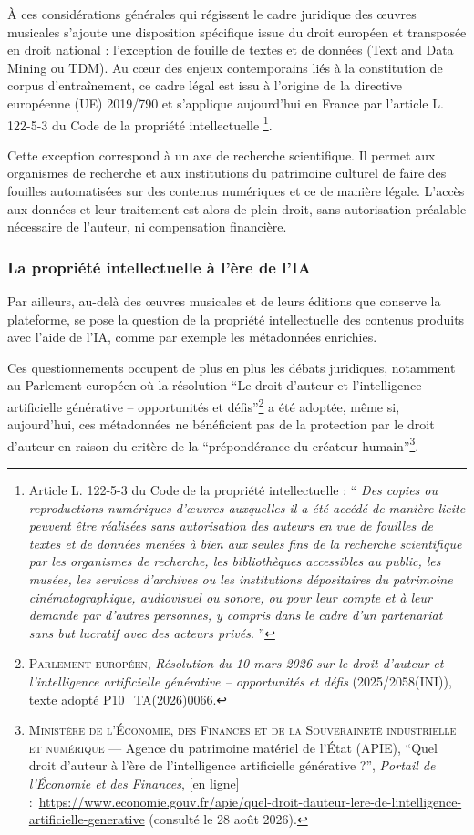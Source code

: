 À ces considérations générales qui régissent le cadre juridique des œuvres musicales s'ajoute une disposition spécifique issue du droit européen et transposée en droit national : l'exception de fouille de textes et de données (Text and Data Mining ou TDM). Au cœur des enjeux contemporains liés à la constitution de corpus d'entraînement, ce cadre légal est issu à l’origine de la directive européenne (UE) 2019/790 et s'applique aujourd'hui en France par l'article L. 122-5-3 du Code de la propriété intellectuelle
\footnote
{Article L. 122-5-3 du Code de la propriété intellectuelle :
	\enquote{
		\textit{Des copies ou reproductions numériques d'œuvres auxquelles il a été accédé de manière licite peuvent être réalisées sans autorisation des auteurs en vue de fouilles de textes et de données menées à bien aux seules fins de la recherche scientifique par les organismes de recherche, les bibliothèques accessibles au public, les musées, les services d'archives ou les institutions dépositaires du patrimoine cinématographique, audiovisuel ou sonore, ou pour leur compte et à leur demande par d'autres personnes, y compris dans le cadre d'un partenariat sans but lucratif avec des acteurs privés}.
	}
}.

Cette exception correspond à un axe de recherche scientifique. Il permet aux organismes de recherche et aux institutions du patrimoine culturel de faire des fouilles automatisées sur des contenus numériques et ce de manière légale. L'accès aux données et leur traitement est alors de plein-droit, sans autorisation préalable nécessaire de l'auteur, ni compensation financière.


\subsubsection*{La propriété intellectuelle à l'ère de l'IA}

Par ailleurs, au-delà des œuvres musicales et de leurs éditions que conserve la plateforme, se pose la question de la propriété intellectuelle des contenus produits avec l'aide de l'IA, comme par exemple les métadonnées enrichies.

Ces questionnements occupent de plus en plus les débats juridiques, notamment au Parlement européen où la résolution \enquote{Le droit d'auteur et l'intelligence artificielle générative – opportunités et défis}\footnote{\textsc{Parlement européen}, \emph{Résolution du 10 mars 2026 sur le droit d’auteur et l’intelligence artificielle générative – opportunités et défis} (2025/2058(INI)), texte adopté P10\_TA(2026)0066.} a été adoptée, même si, aujourd'hui, ces métadonnées ne bénéficient pas de la protection par le droit d’auteur en raison du critère de la \enquote{prépondérance du créateur humain}\footnote{\textsc{Ministère de l'Économie, des Finances et de la Souveraineté industrielle et numérique} — Agence du patrimoine matériel de l'État (APIE), \enquote{Quel droit d'auteur à l'ère de l'intelligence artificielle générative ?}, \emph{Portail de l'Économie et des Finances}, [en ligne] :~\url{https://www.economie.gouv.fr/apie/quel-droit-dauteur-lere-de-lintelligence-artificielle-generative} (consulté le 28 août 2026).}.




